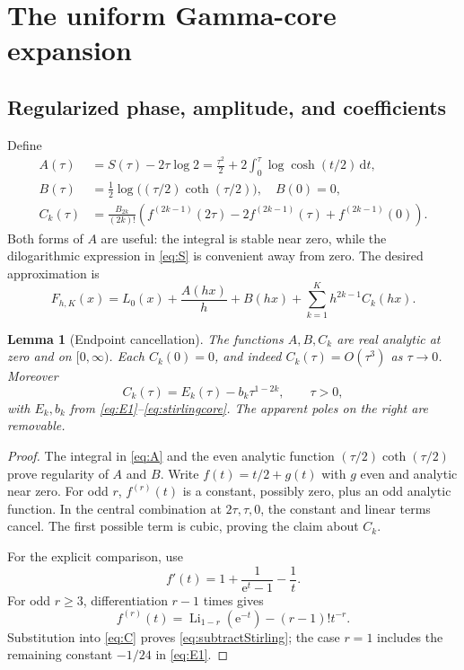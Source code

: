 \documentclass[11pt,a4paper]{article}
\numberwithin{equation}{section}
\newtheorem{lemma}[theorem]{Lemma}
\theoremstyle{definition}
\newcommand{\ee}{\mathrm e}
\newcommand{\dd}{\,\mathrm d}
\newcommand{\Li}{\operatorname{Li}}
\begin{document}
\section{The uniform Gamma-core expansion}
\label{sec:uniform}

\subsection{Regularized phase, amplitude, and coefficients}
Define
\begin{align}
A(\tau)&=S(\tau)-2\tau\log2
 =\frac{\tau^2}{2}+2\int_0^\tau\log\cosh(t/2)\dd t,\label{eq:A}\\
B(\tau)&=\frac12\log\bigl((\tau/2)\coth(\tau/2)\bigr),\quad B(0)=0,
\label{eq:B}\\
C_k(\tau)&=\frac{B_{2k}}{(2k)!}
 \left(f^{(2k-1)}(2\tau)-2f^{(2k-1)}(\tau)
                                      +f^{(2k-1)}(0)\right).
\label{eq:C}
\end{align}
Both forms of $A$ are useful: the integral is stable near zero, while the dilogarithmic expression in \eqref{eq:S} is convenient away from zero. The desired approximation is
\begin{equation}
\boxed{\displaystyle
F_{h,K}(x)=L_0(x)+\frac{A(hx)}h+B(hx)
                      +\sum_{k=1}^K h^{2k-1}C_k(hx).}
\label{eq:F}
\end{equation}

\begin{lemma}[Endpoint cancellation]
\label{lem:regular}
The functions $A,B,C_k$ are real analytic at zero and on $[0,\infty)$. Each $C_k(0)=0$, and indeed $C_k(\tau)=O(\tau^3)$ as $\tau\to0$. Moreover
\begin{equation}
C_k(\tau)=E_k(\tau)-b_k\tau^{1-2k},\qquad \tau>0,
\label{eq:subtractStirling}
\end{equation}
with $E_k,b_k$ from \eqref{eq:E1}--\eqref{eq:stirlingcore}. The apparent poles on the right are removable.
\end{lemma}
\begin{proof}
The integral in \eqref{eq:A} and the even analytic function $(\tau/2)\coth(\tau/2)$ prove regularity of $A$ and $B$. Write $f(t)=t/2+g(t)$ with $g$ even and analytic near zero. For odd $r$, $f^{(r)}(t)$ is a constant, possibly zero, plus an odd analytic function. In the central combination at $2\tau,\tau,0$, the constant and linear terms cancel. The first possible term is cubic, proving the claim about $C_k$.

For the explicit comparison, use
\[
f'(t)=1+\frac1{\ee^t-1}-\frac1t.
\]
For odd $r\ge3$, differentiation $r-1$ times gives
\[
f^{(r)}(t)=\Li_{1-r}(\ee^{-t})-(r-1)!t^{-r}.
\]
Substitution into \eqref{eq:C} proves \eqref{eq:subtractStirling}; the case $r=1$ includes the remaining constant $-1/24$ in \eqref{eq:E1}.
\end{proof}
\end{document}
